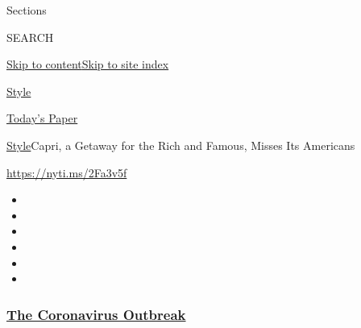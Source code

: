 Sections

SEARCH

\protect\hyperlink{site-content}{Skip to
content}\protect\hyperlink{site-index}{Skip to site index}

\href{https://www.nytimes3xbfgragh.onion/section/style}{Style}

\href{https://myaccount.nytimes3xbfgragh.onion/auth/login?response_type=cookie\&client_id=vi}{}

\href{https://www.nytimes3xbfgragh.onion/section/todayspaper}{Today's
Paper}

\href{/section/style}{Style}\textbar{}Capri, a Getaway for the Rich and
Famous, Misses Its Americans

\url{https://nyti.ms/2Fa3v5f}

\begin{itemize}
\item
\item
\item
\item
\item
\item
\end{itemize}

\hypertarget{the-coronavirus-outbreak}{%
\subsubsection{\texorpdfstring{\href{https://www.nytimes3xbfgragh.onion/news-event/coronavirus?name=styln-coronavirus-national\&region=TOP_BANNER\&block=storyline_menu_recirc\&action=click\&pgtype=Article\&impression_id=bae62ef0-f27e-11ea-b230-435ddf4f92b6\&variant=undefined}{The
Coronavirus
Outbreak}}{The Coronavirus Outbreak}}\label{the-coronavirus-outbreak}}

